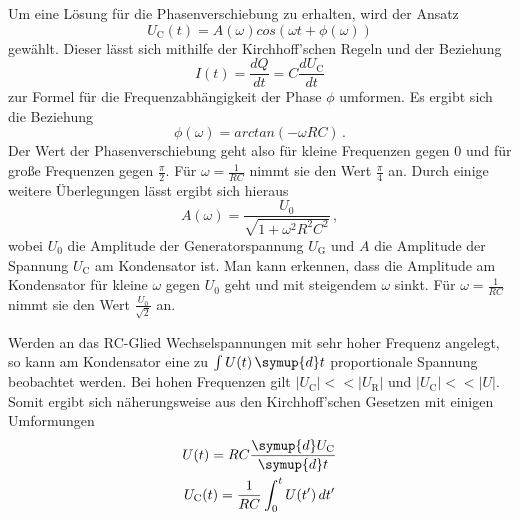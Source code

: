 Um eine Lösung für die Phasenverschiebung zu erhalten, wird der Ansatz
\begin{equation}
  U_{\text{C}}(t)=A(\omega)cos(\omega t + \phi(\omega))
\end{equation}
gewählt. Dieser lässt sich mithilfe der Kirchhoff'schen Regeln und der Beziehung
\begin{equation}
  I(t)=\frac{dQ}{dt}=C\frac{dU_{\text{C}}}{dt}
\end{equation}
zur Formel für die Frequenzabhängigkeit der Phase $\phi$ umformen. Es ergibt sich die
Beziehung
\begin{equation}
  \phi(\omega)=arctan(-\omega R C) \,.
\end{equation}
Der Wert der Phasenverschiebung geht also für kleine Frequenzen gegen $0$ und für
große Frequenzen gegen $\frac{\pi}{2}$. Für $\omega=\frac{1}{RC}$ nimmt sie den Wert
$\frac{\pi}{4}$ an.
Durch einige weitere Überlegungen lässt ergibt sich hieraus
\begin{equation}
  A(\omega)=\frac{U_{\text{0}}}{\sqrt{1+\omega^2 R^2 C^2}} \,,
\end{equation}
wobei $U_{\text{0}}$ die Amplitude der Generatorspannung $U_{\text{G}}$ und $A$ die
Amplitude der Spannung $U_{\text{C}}$ am Kondensator ist.
Man kann erkennen, dass die Amplitude am Kondensator für kleine $\omega$ gegen $U_{\text{0}}$ geht
und mit steigendem $\omega$ sinkt. Für $\omega=\frac{1}{RC}$ nimmt sie den Wert
$\frac{U_{\text{0}}}{\sqrt{2}}$ an.

Werden an das RC-Glied Wechselspannungen mit sehr hoher Frequenz angelegt, so kann
am Kondensator eine zu $\int U(t)\,\symup{d}t$ proportionale Spannung beobachtet werden.
Bei hohen Frequenzen gilt $\lvert U_{\text{C}} \rvert << \lvert U_{\text{R}} \rvert$
und $\lvert U_{\text{C}} \rvert << \lvert U \rvert$. Somit ergibt sich näherungsweise
aus den Kirchhoff'schen Gesetzen mit einigen Umformungen
\begin{gather}
  U(t)= R C \frac{\symup{d}U_{\text{C}}}{\symup{d}t} \\
  U_{\text{C}}(t)=\frac{1}{RC}\int_0^t U(t')\, dt'
\end{gather}



\label{sec:Theorie}
